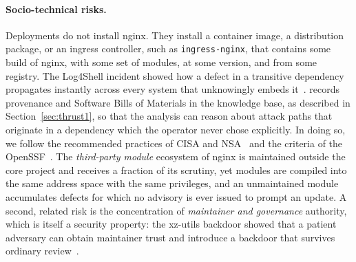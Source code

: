\paragraph{Socio-technical risks.}
Deployments do not install nginx. They install a container image, a distribution package, or an ingress
controller, such as \texttt{ingress-nginx}, that contains some build of nginx, with some set of modules, at some version, and from some registry. The
Log4Shell incident showed how a defect in a transitive dependency propagates
instantly across every system that unknowingly embeds it~\cite{log4shell}.
\sysname records provenance and Software Bills of Materials in the knowledge
base, as described in Section~\ref{sec:thrust1}, so that the analysis can
reason about attack paths that originate in a dependency which the operator
never chose explicitly. In doing so, we follow the recommended practices of
CISA and NSA~\cite{cisansa} and the criteria of the OpenSSF~\cite{openssf}.
The \emph{third-party module} ecosystem of nginx is maintained outside the
core project and receives a fraction of its scrutiny, yet modules are compiled
into the same address space with the same privileges, and an unmaintained
module accumulates defects for which no advisory is ever issued to prompt an
update. A second, related risk is the concentration of \emph{maintainer and
governance} authority, which is itself a security property: the xz-utils
backdoor showed that a patient adversary can obtain maintainer trust and
introduce a backdoor that survives ordinary review~\cite{xzbackdoor}.


